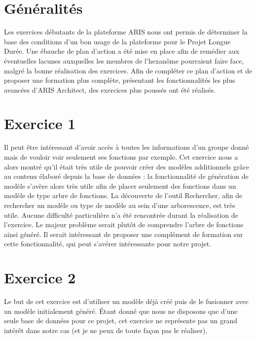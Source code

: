 
\section{Généralités}

Les exercices débutants de la plateforme ARIS nous ont permis de déterminer la base des conditions d'un bon usage de la plateforme pour le Projet Longue Durée. Une ébauche de plan d'action a été mise en place afin de remédier aux éventuelles lacunes auxquelles les membres de l'hexanôme pourraient faire face, malgré la bonne réalisation des exercices.\newline
Afin de compléter ce plan d'action et de proposer une formation plus complète, présentant les fonctionnalités les plus avancées d'ARIS Architect, des exercices plus poussés ont été réalisés.

\section{Exercice 1}

Il peut être intéressant d'avoir accès à toutes les informations d'un groupe donné mais de vouloir voir seulement ses fonctions par exemple. Cet exercice nous a alors montré qu'il était très utile de pouvoir créer des modèles additionnels grâce au contenu élaboré depuis la base de données : la fonctionnalité de génération de modèle s'avère alors très utile afin de placer seulement des fonctions dans un modèle de type \og{}arbre de fonctions\fg{}. La découverte de l’outil \og{}Rechercher\fg{}, afin de rechercher un modèle ou type de modèle au sein d'une arborescence, est très utile. \newline
Aucune difficulté particulière n'a été rencontrée durant la réalisation de l'exercice. Le majeur problème serait plutôt de comprendre l'arbre de fonctions ainsi généré. Il serait intéressant de proposer une complément de formation sur cette fonctionnalité, qui peut s'avérer intéressante pour notre projet.

\section{Exercice 2}

Le but de cet exercice est d’utiliser un modèle déjà créé puis de le fusionner avec un modèle initialement généré. \'Etant donné que nous ne disposons que d’une seule base de données pour ce projet, cet exercice ne représente pas un grand intérêt dans notre cas (et je ne peux de toute façon pas le réaliser).

